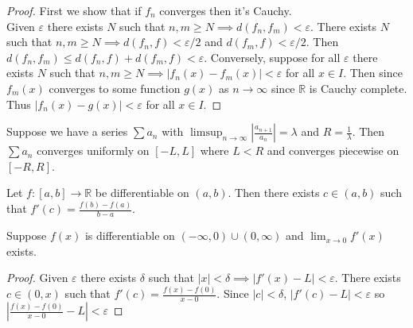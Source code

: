 \documentclass{article}
\newcommand{\R}{\mathbb{R}}
\newcommand{\eps}{\varepsilon}
\newcommand{\ra}[1][]{\xrightarrow{#1}}
\begin{document}
\begin{proof}
  First we show that if $f_n$ converges then it's Cauchy.\\
  Given $\eps$ there exists $N$ such that $n,m\geq N\implies d(f_n,f_m)<\eps$. There exists $N$ such that $n,m\geq N\implies d(f_n,f)<\eps/2$ and $d(f_m,f)<\eps/2$. Then $d(f_n,f_m)\leq d(f_n,f)+d(f_m,f)<\eps$. Conversely, suppose for all $\eps$ there exists $N$ such that $n,m\geq N\implies |f_n(x)-f_m(x)|<\eps$ for all $x\in I$. Then since $f_m(x)$ converges to some function $g(x)$ as $n\ra\infty$ since $\R$ is Cauchy complete. Thus $|f_n(x)-g(x)|<\eps$ for all $x\in I$.
\end{proof}
\begin{theorem}
  Suppose we have a series $\sum a_n$ with $\limsup_{n\to\infty}|\frac{a_{n+1}}{a_n}|=\lambda$ and $R=\frac{1}{\lambda}$. Then $\sum a_n$ converges uniformly on $[-L,L]$ where $L<R$ and converges piecewise on $[-R,R]$.
\end{theorem}
\begin{theorem}
  Let $f:[a,b]\ra \R$ be differentiable on $(a,b)$. Then there exists $c\in(a,b)$ such that $f'(c)=\frac{f(b)-f(a)}{b-a}$.
\end{theorem}
\begin{problem}
  Suppose $f(x)$ is differentiable on $(-\infty,0)\cup(0,\infty)$ and $\lim_{x\to 0}f'(x)$ exists.
\end{problem}
\begin{proof}
  Given $\eps$ there exists $\delta$ such that $|x|<\delta\implies |f'(x)-L|<\eps$. There exists $c\in(0,x)$ such that $f'(c)=\frac{f(x)-f(0)}{x-0}$. Since $|c|<\delta$, $|f'(c)-L|<\eps$ so $|\frac{f(x)-f(0)}{x-0}-L|<\eps$
\end{proof}
\end{document}

